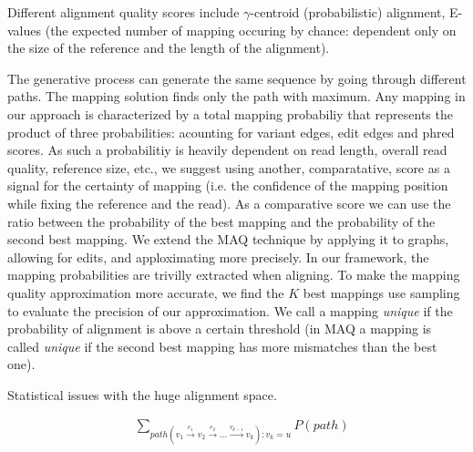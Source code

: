 Different alignment quality scores include $\gamma$-centroid (probabilistic) alignment, E-values\cite{frith2010parameters} (the expected number of mapping occuring by chance: dependent only on the size of the reference and the length of the alignment). 


The generative process can generate the same sequence by going through different paths.
The mapping solution finds only the path with maximum.
Any mapping in our approach is characterized by a total mapping probabiliy that represents the product of
	three probabilities: acounting for variant edges, edit edges and phred scores.
As such a probabilitiy is heavily dependent on read length, overall read quality, reference size, etc.,
	we suggest using another, comparatative, score as a signal for the certainty of mapping
	(i.e. the confidence of the mapping position while fixing the reference and the read).
As a comparative score we can use the ratio between the probability of the best mapping and the probability of the second best mapping.
We extend the MAQ\cite{maq2008mapping} technique by applying it to graphs, allowing for edits, and apploximating more precisely.
In our framework, the mapping probabilities are trivilly extracted when aligning.
To make the mapping quality approximation more accurate, we find the $K$ best mappings use sampling to evaluate the precision of our approximation.
We call a mapping \textit{unique} if the probability of alignment is above a certain threshold
	(in MAQ a mapping is called \textit{unique} if the second best mapping has more mismatches than the best one).

Statistical issues with the huge alignment space.

\begin{align*}
	& \sum_{path(v_1 \xrightarrow{e_1} v_2 \xrightarrow{e_2} \dots \xrightarrow{v_{k-1}} v_k) \colon v_k=u} P(path) 
\end{align*}

